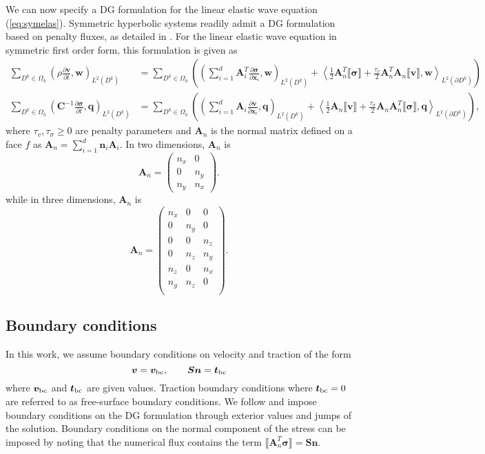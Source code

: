\documentclass{siamart0216}
\newcommand{\pd}[2]{\frac{\partial#1}{\partial#2}}
\newcommand{\LRp}[1]{\left( #1 \right)}
\newcommand{\LRa}[1]{\left\langle #1 \right\rangle}
\newcommand{\jump}[1] {\ensuremath{\llbracket#1\rrbracket}}
\renewcommand{\Oh}{{\Omega_h}}
\newcommand{\Lk}{L^2\LRp{D^k}}
\newcommand{\Ldk}{L^2\LRp{\partial D^k}}
\begin{document}
We can now specify a DG formulation for the linear elastic wave equation (\ref{eq:symelas}).  Symmetric hyperbolic systems readily admit a DG formulation based on penalty fluxes, as detailed in \cite{chan2016short}.  For the linear elastic wave equation in symmetric first order form, this formulation is given as
\begin{align}
\sum_{D^k\in \Oh}\LRp{\rho \pd{\bm{v}}{t},\bm{w}}_{\Lk} &= \sum_{D^k\in \Oh}\LRp{\LRp{ \sum_{i=1}^d \bm{A}_i^T\pd{\bm{\sigma}}{\bm{x}_i},\bm{w}}_{\Lk}  + \LRa{\frac{1}{2}\bm{A}_n^T\jump{\bm{\sigma}} + \frac{\tau_v}{2}\bm{A}_n^T\bm{A}_n\jump{\bm{v}},\bm{w}}_{\Ldk}} \nonumber\\
\sum_{D^k\in \Oh}\LRp{\bm{C}^{-1} \pd{\bm{\sigma}}{t},\bm{q}}_{\Lk} &= \sum_{D^k\in \Oh}\LRp{\LRp{\sum_{i=1}^d \bm{A}_i \pd{\bm{v}}{\bm{x}_i},\bm{q}}_{\Lk} + \LRa{\frac{1}{2}\bm{A}_n\jump{\bm{v}} + \frac{\tau_{\sigma}}{2}\bm{A}_n\bm{A}_n^T\jump{\bm{\sigma}},\bm{q}}_{\Ldk}},
\label{eq:dgform}
\end{align}
where $\tau_v,\tau_\sigma \geq 0$ are penalty parameters and $\bm{A}_n$ is the normal matrix defined on a face $f$ as $\bm{A}_n = \sum_{i=1}^d \bm{n}_i \bm{A}_i$.  In two dimensions, $\bm{A}_n$ is 
\[
\bm{A}_n =  \LRp{\begin{array}{cc}
{n}_x & 0\\
 0 & {n}_y\\
{n}_y & {n}_x
\end{array}}.
\]
while in three dimensions, $\bm{A}_n$ is
\[
\bm{A}_n =  \LRp{\begin{array}{ccc}
{n}_x & 0 & 0\\
 0 & {n}_y & 0\\
0&  0 & {n}_z \\
0 &{n}_z & {n}_y\\
{n}_z & 0 & {n}_x\\
{n}_y & {n}_z & 0\\
\end{array}}.  
\]

\subsection{Boundary conditions}

In this work, we assume boundary conditions on velocity and traction of the form
\[
\bm{v} = \bm{v}_{\rm bc}, \qquad \bm{S}\bm{n} = \bm{t}_{\rm bc}
\]
where $\bm{v}_{\rm bc}$ and $\bm{t}_{\rm bc}$ are given values.  Traction boundary conditions where $\bm{t}_{\rm bc} = 0$ are referred to as free-surface boundary conditions.  We follow \cite{leveque2002finite,wilcox2010high} and impose boundary conditions on the DG formulation through exterior values and jumps of the solution.  Boundary conditions on the normal component of the stress can be imposed by noting that the numerical flux contains the term $\jump{\bm{A}_n^T\bm{\sigma}} = \bm{S}\bm{n}$.  
\end{document}
